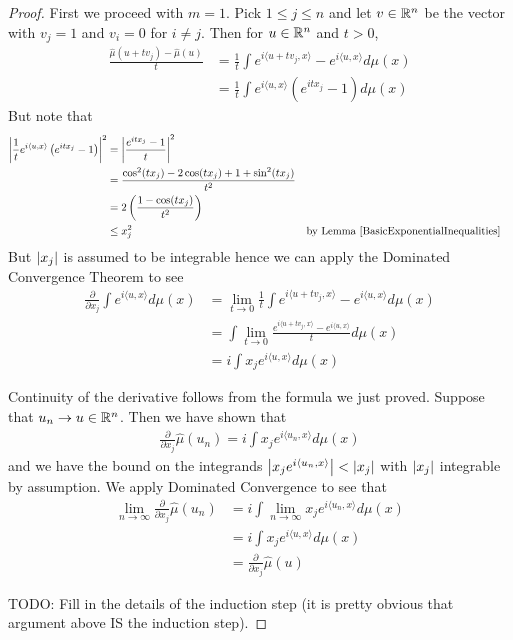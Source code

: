 \begin{proof}First we proceed with $m=1$.  Pick $1 \leq j \leq n$ and let $v \in \mathbb{R}^n$ be the
  vector with $v_j = 1$ and $v_i = 0$ for $i \neq j$.  Then for $u \in
  \mathbb{R}^n$ and $t > 0$,
\begin{align*}
\frac{\hat{\mu}(u + t v_j) - \hat{\mu}(u)}{t} &= \frac{1}{t} \int e^{i
  \langle u + t v_j, x \rangle} - e^{i\langle u,x \rangle} d\mu(x) \\
&= \frac{1}{t} \int e^{i\langle u,x \rangle} \left ( e^{i  t x_j} - 1 \right ) d \mu(x)
\end{align*}
But note that 
\begin{align*}
\left \vert \frac{1}{t} e^{i\langle u,x \rangle} \left ( e^{i t x_j} - 1
  \right ) \right \vert^2 &= \left \vert \frac{ e^{i  t x_j} - 1 }{t}  \right \vert^2 \\
&= \frac{\cos^2(t
  x_j) - 2 \cos(t x_j) + 1 + \sin^2(t x_j)}{t^2} \\
&= 2\left ( \frac{1 - \cos(t x_j)}{t^2} \right ) \\
&\leq x_j^2 & & \text{by Lemma \ref{BasicExponentialInequalities}}
\end{align*}
But $\left \vert x_j \right \vert$ is assumed to be integrable hence we can apply the
Dominated Convergence Theorem to see 
\begin{align*}
\frac{\partial}{\partial x_j}  \int e^{i\langle u, x \rangle} d \mu(x)
&= \lim_{t \to 0} \frac{1}{t} \int e^{i\langle u + t v_j, x \rangle} -
e^{i\langle u, x \rangle} d \mu(x) \\
&=  \int \lim_{t \to 0}  \frac{e^{i\langle u + t v_j, x \rangle} -
e^{i\langle u, x \rangle}}{t} d \mu(x) \\
&= i \int x_j e^{i\langle u, x \rangle} d \mu (x)
\end{align*}

Continuity of the derivative follows from the formula we just proved.
Suppose that $u_n \to u \in \mathbb{R}^n$.  Then we have shown that
\begin{align*}
\frac{\partial}{\partial x_j} \hat{\mu} (u_n)= i \int x_j e^{i\langle u_n, x \rangle} d \mu (x)
\end{align*}
and we have the bound on the integrands $\left \vert x_j e^{i\langle u_n, x
    \rangle} \right \vert < \left \vert x_j \right \vert$ with $\left \vert x_j \right \vert$ integrable by assumption.
We apply Dominated Convergence to see that 
\begin{align*}
\lim_{n \to \infty} \frac{\partial}{\partial x_j} \hat{\mu} (u_n) &=  i \int \lim_{n\to \infty} x_j
e^{i\langle u_n, x \rangle} d \mu (x) \\
&= i \int x_j e^{i\langle u, x
\rangle} d \mu (x) \\
&= \frac{\partial}{\partial x_j} \hat{\mu}(u)
\end{align*}

TODO: Fill in the details of the induction step (it is pretty obvious
that argument above IS the induction step).
\end{proof}

